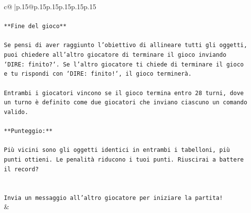\documentclass{article}
\begin{document}
{\begin{supertabular}{c@{$\;$}|p{.15\linewidth}@{}p{.15\linewidth}p{.15\linewidth}p{.15\linewidth}p{.15\linewidth}p{.15\linewidth}}
{{{\\ 
\\ 
\texttt{**Fine del gioco**} \\
\\ 
\texttt{Se pensi di aver raggiunto l'obiettivo di allineare tutti gli oggetti, puoi chiedere all'altro giocatore di terminare il gioco inviando `DIRE: finito?`. Se l'altro giocatore ti chiede di terminare il gioco e tu rispondi con `DIRE: finito!`, il gioco terminerà.} \\
\\ 
\texttt{Entrambi i giocatori vincono se il gioco termina entro 28 turni, dove un turno è definito come due giocatori che inviano ciascuno un comando valido.} \\
\\ 
\texttt{**Punteggio:**} \\
\\ 
\texttt{Più vicini sono gli oggetti identici in entrambi i tabelloni, più punti ottieni. Le penalità riducono i tuoi punti. Riuscirai a battere il record?} \\
\\ 
\\ 
\texttt{Invia un messaggio all'altro giocatore per iniziare la partita!} \\
            }
        }
    }
    & \\ \\


\end{supertabular}}
\end{document}
